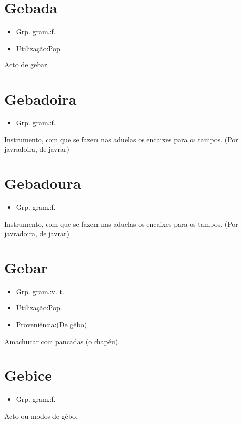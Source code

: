 \section{Gebada}
\begin{itemize}
\item {Grp. gram.:f.}
\end{itemize}
\begin{itemize}
\item {Utilização:Pop.}
\end{itemize}
Acto de gebar.
\section{Gebadoira}
\begin{itemize}
\item {Grp. gram.:f.}
\end{itemize}
Instrumento, com que se fazem nas aduelas os encaixes para os tampos.
(Por \textunderscore javradoira\textunderscore , de \textunderscore javrar\textunderscore )
\section{Gebadoura}
\begin{itemize}
\item {Grp. gram.:f.}
\end{itemize}
Instrumento, com que se fazem nas aduelas os encaixes para os tampos.
(Por \textunderscore javradoira\textunderscore , de \textunderscore javrar\textunderscore )
\section{Gebar}
\begin{itemize}
\item {Grp. gram.:v. t.}
\end{itemize}
\begin{itemize}
\item {Utilização:Pop.}
\end{itemize}
\begin{itemize}
\item {Proveniência:(De \textunderscore gêbo\textunderscore )}
\end{itemize}
Amachucar com pancadas (o chapéu).
\section{Gebice}
\begin{itemize}
\item {Grp. gram.:f.}
\end{itemize}
Acto ou modos de gêbo.
